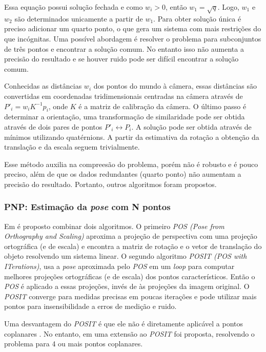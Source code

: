 Essa equação possui solução fechada e como $w_i > 0$, então $w_1 = \sqrt{q}$. Logo, $w_1$ e $w_2$ são determinados unicamente a partir de $w_1$. Para obter solução única é preciso adicionar um quarto ponto, o que gera um sistema com mais restrições do que incógnitas. Uma possível abordagem é resolver o problema para subconjuntos de três pontos e encontrar a solução comum. No entanto isso não aumenta a precisão do resultado e se houver ruido pode ser difícil encontrar a solução comum. 

Conhecidas as distâncias $w_i$ dos pontos do mundo à câmera, essas distâncias são convertidas em coordenadas tridimensionais centradas na câmera através de ${P'}_i = w_i {K}^{-1} {p}_i$, onde ${K}$ é a matriz de calibração da câmera. O último passo é determinar a orientação, uma transformação de similaridade pode ser obtida através de dois pares de pontos ${P'}_i \leftrightarrow {P}_i$. A solução pode ser obtida através de mínimos utilizando quatérnions. A partir da estimativa da rotação a obtenção da translação e da escala seguem trivialmente. 

Esse método auxilia na compreesão do problema, porém não é robusto e é pouco preciso, além de que os dados redundantes (quarto ponto) não aumentam a precisão do resultado. Portanto, outros algoritmos foram propostos.

\subsubsection{PNP: Estimação da \textit{pose} com N pontos}
Em \citep{dementhon1995model} é proposto combinar dois algoritmos. O primeiro \textit{POS (Pose from Orthography and Scaling)} aproxima a projeção de perspectiva com uma projeção ortográfica (e de escala) e encontra a matriz de rotação e o vetor de translação do objeto resolvendo um sistema linear. O segundo algoritmo \textit{POSIT (POS with ITerations)}, usa a \textit{pose} aproximada pelo \textit{POS} em um \textit{loop} para computar melhores projeções ortográficas (e de escala) dos pontos característicos. Então o \textit{POS} é aplicado a essas projeções, invés de às projeções da imagem original. O \textit{POSIT} converge para medidas precisas em poucas iterações e pode utilizar mais pontos para insensibilidade a erros de medição e ruido. 

Uma desvantagem do \textit{POSIT} é que ele não é diretamente aplicável a pontos coplanares \citep{marchand2016pose}. No entanto, em \citep{oberkampf1996iterative} uma extensão ao \textit{POSIT} foi proposta, resolvendo o problema para 4 ou mais pontos coplanares. 


